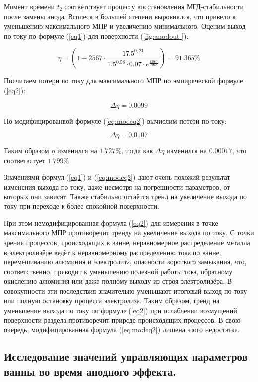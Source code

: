\documentclass{article}
\begin{document}
Момент времени $t_2$ соответствует процессу восстановления МГД-стабильности после замены анода. Всплеск в большей степени выровнялся, что привело к уменьшению максимального МПР и увеличению минимального. Оценим выход по току по формуле (\ref{eq1}) для поверхности (\ref{fig:anodout-}):

\begin{equation}
\eta=(1-2567 \cdot \frac{17.5^{0,21}}{1.5^{0.58} \cdot 0.07 \cdot e^{\frac{12940}{960}}}) = 91.365 \%
\end{equation}

Посчитаем потери по току для максимального МПР по эмпирической формуле (\ref{eq2}):

\begin{equation}
\Delta \eta = 0.0099
\end{equation}

По модифицированной формуле (\ref{eq:modeq2}) вычислим потери по току:

\begin{equation}
\Delta \eta = 0.0107
\end{equation}

Таким образом $\eta$ изменился на $1.727\%$, тогда как $\Delta \eta$ изменился на $0.00017$, что соответвстует $1.799\%$

Значениями формул (\ref{eq1}) и (\ref{eq:modeq2}) дают очень похожий результат изменения выхода по току, даже несмотря на погрешности параметров, от которых они зависят. Также стабильно остаётся тренд на увеличение выхода по току при переходе к более спокойной поверхности.

При этом немодифицированная формула (\ref{eq2}) для измерения в точке максимального МПР противоречит тренду на увеличение выхода по току. С точки зрения процессов, происходящих в ванне, неравномерное распределение металла в электролизёре ведёт к неравномерному распределению тока по ванне, перемешиванию алюминия и электролита, опасности короткого замыкания, что, соответственно, приводит к уменьшению полезной работы тока, обратному окислению алюминия или даже полному выходу из строя электролизёра. В совокупности эти последствия значительно уменьшают итоговый выход по току или полную остановку процесса электролиза. Таким образом, тренд на уменьшение выхода по току по формуле (\ref{eq2}) при ослаблении возмущений поверхности раздела противоречит природе происходящих процессов. В свою очередь, модифицированная формула (\ref{eq:modeq2}) лишена этого недостатка.

\subsection{Исследование значений управляющих параметров ванны во время анодного эффекта.}
\end{document}
